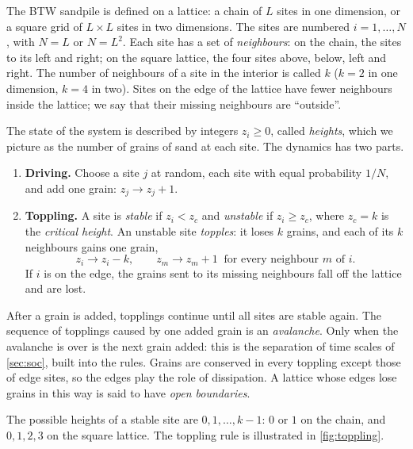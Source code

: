 The BTW sandpile is defined on a lattice: a chain of $L$ sites in one dimension, or a square grid of $L\times L$
sites in two dimensions. The sites are numbered $i=1,\dots,N$, with $N=L$ or $N = L^2$. Each site has a set of
\emph{neighbours}: on the chain, the sites to its left and right; on the square lattice, the four sites above,
below, left and right. The number of neighbours of a site in the interior is called $k$ ($k=2$ in one dimension,
$k=4$ in two). Sites on the edge of the lattice have fewer neighbours inside the lattice; we say that their
missing neighbours are ``outside''.

The state of the system is described by integers $z_i\ge0$, called \emph{heights}, which we picture as the
number of grains of sand at each site. The dynamics has two parts.
\begin{enumerate}
  \item \textbf{Driving.} Choose a site $j$ at random, each site with equal probability $1/N$, and add one grain:
    $z_j\to z_j+1$.
  \item \textbf{Toppling.} A site is \emph{stable} if $z_i < z_c$ and \emph{unstable} if $z_i\ge z_c$, where
    $z_c = k$ is the \emph{critical height}. An unstable site \emph{topples}: it loses $k$ grains, and each of its
    $k$ neighbours gains one grain,
    \begin{equation}
      z_i \to z_i - k,\qquad z_{m} \to z_{m}+1 \ \text{ for every neighbour } m \text{ of } i.
    \end{equation}
    If $i$ is on the edge, the grains sent to its missing neighbours fall off the lattice and are lost.
\end{enumerate}
After a grain is added, topplings continue until all sites are stable again. The sequence of topplings caused by
one added grain is an \emph{avalanche}. Only when the avalanche is over is the next grain added: this is the
separation of time scales of \cref{sec:soc}, built into the rules. Grains are conserved in every toppling except
those of edge sites, so the edges play the role of dissipation. A lattice whose edges lose grains in this way is
said to have \emph{open boundaries}.

The possible heights of a stable site are $0,1,\dots,k-1$: $0$ or $1$ on the chain, and $0,1,2,3$ on the square
lattice. The toppling rule is illustrated in \cref{fig:toppling}.


